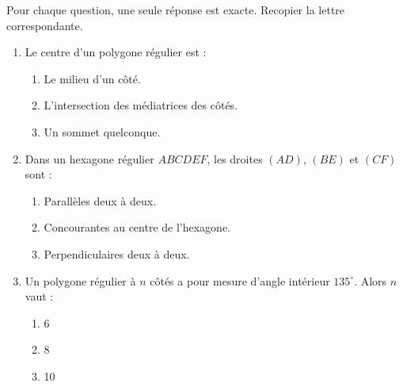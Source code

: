 \documentclass[11pt]{article}
\begin{document}
\begin{exercice}
Pour chaque question, une seule réponse est exacte. Recopier la lettre correspondante.
\begin{enumerate}
    \item Le centre d'un polygone régulier est :
    \begin{enumerate}
        \item Le milieu d'un côté.
        \item L'intersection des médiatrices des côtés.
        \item Un sommet quelconque.
    \end{enumerate}
    \item Dans un hexagone régulier $ABCDEF$, les droites $(AD)$, $(BE)$ et $(CF)$ sont :
    \begin{enumerate}
        \item Parallèles deux à deux.
        \item Concourantes au centre de l'hexagone.
        \item Perpendiculaires deux à deux.
    \end{enumerate}
    \item Un polygone régulier à $n$ côtés a pour mesure d'angle intérieur $135^\circ$. Alors $n$ vaut :
    \begin{enumerate}
        \item 6
        \item 8
        \item 10
    \end{enumerate}
\end{enumerate}
\end{exercice}
\end{document}
